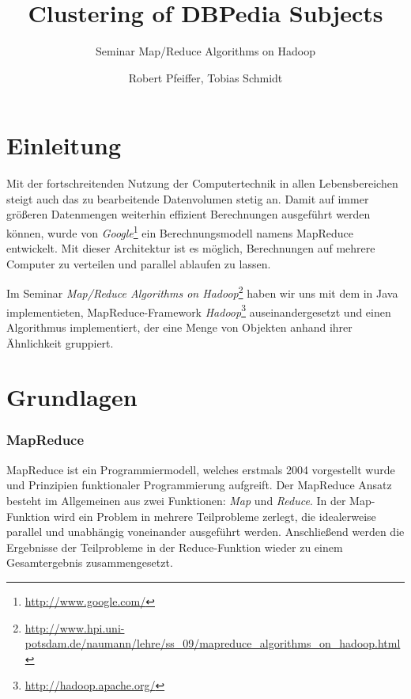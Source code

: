 \documentclass[a4paper]{llncs}
\begin{document}
\title{Clustering of DBPedia Subjects}
\subtitle{Seminar Map/Reduce Algorithms on Hadoop}
\author{Robert Pfeiffer, Tobias Schmidt}

\maketitle

\section{Einleitung}
Mit der fortschreitenden Nutzung der Computertechnik in allen Lebensbereichen steigt auch das zu bearbeitende Datenvolumen stetig an. Damit auf immer größeren Datenmengen weiterhin effizient Berechnungen ausgeführt werden können, wurde von \emph{Google}\footnote{\url{http://www.google.com/}} ein Berechnungsmodell namens MapReduce entwickelt. Mit dieser Architektur ist es möglich, Berechnungen auf mehrere Computer zu verteilen und parallel ablaufen zu lassen.

Im Seminar \emph{Map/Reduce Algorithms on Hadoop}\footnote{\url{http://www.hpi.uni-potsdam.de/naumann/lehre/ss_09/mapreduce_algorithms_on_hadoop.html}} haben wir uns mit dem in Java implementieten, MapReduce-Framework \emph{Hadoop}\footnote{\url{http://hadoop.apache.org/}} auseinandergesetzt und einen Algorithmus implementiert, der eine Menge von Objekten anhand ihrer Ähnlichkeit gruppiert.

\section{Grundlagen}

\subsubsection{MapReduce}
MapReduce ist ein Programmiermodell, welches erstmals 2004 vorgestellt wurde \cite{DG04} und Prinzipien funktionaler Programmierung aufgreift. 
Der MapReduce Ansatz besteht im Allgemeinen aus zwei Funktionen: \emph{Map} und \emph{Reduce}. In der Map-Funktion wird ein Problem in mehrere Teilprobleme zerlegt, die idealerweise parallel und unabhängig voneinander ausgeführt werden.
Anschließend werden die Ergebnisse der Teilprobleme in der Reduce-Funktion wieder zu einem Gesamtergebnis zusammengesetzt.
\end{document}
